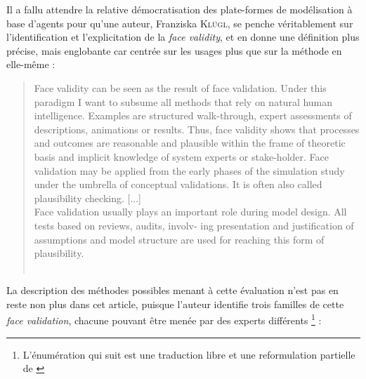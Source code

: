 Il a fallu attendre la relative démocratisation des plate-formes de modélisation à base d'agents pour qu'une auteur, Franziska K\textsc{lügl}, se penche véritablement sur l'identification et l'explicitation de la \textit{face validity}, et en donne une définition plus précise, mais englobante car centrée sur les usages plus que sur la méthode en elle-même :

\begin{quotation}
	\og Face validity can be seen as the result of face validation. Under this paradigm I want to subsume all methods that rely on natural human intelligence. Examples are structured walk-through, expert assessments of descriptions, animations or results. Thus, face validity shows that processes and outcomes are reasonable and plausible within the frame of theoretic basis and implicit knowledge of system experts or stake-holder. Face validation may be applied from the early phases of the simulation study under the umbrella of conceptual validations. It is often also called plausibility checking.
	[...]\\
	Face validation usually plays an important role during
	model design. All tests based on reviews, audits, involv-
	ing presentation and justification of assumptions and model
	structure are used for reaching this form of plausibility.
	\fg{}\\
	\mbox{}~ \hfill \cite[39;41]{klugl_validation_2008}
\end{quotation}


La description des méthodes possibles menant à cette évaluation n'est pas en reste non plus dans cet article, puisque l'auteur identifie trois familles de cette \textit{face validation}, chacune pouvant être menée par des experts différents \footnote{L'énumération qui suit est une traduction libre et une reformulation partielle de \cite[41-42]{klugl_validation_2008}} :

